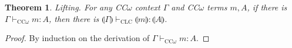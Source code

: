 \documentclass{article}
\newtheorem{theorem}{Theorem}[section]
\theoremstyle{definition}
\newcommand{\lift}[1]{\llparenthesis #1 \rrparenthesis}
\begin{document}
\begin{theorem}\label{lifting}
  Lifting. For any CC$\omega$ context $\Gamma$ and CC$\omega$ terms $m, A$, if there is $\Gamma \vdash_{\scriptscriptstyle \text{CC$\omega$}} m : A$, then there is $\lift{\Gamma} \vdash_{\scriptscriptstyle \text{CLC}} \lift{m} : \lift{A}$.
\end{theorem}
\begin{proof}
  By induction on the derivation of $\Gamma \vdash_{\scriptscriptstyle \text{CC$\omega$}} m : A$.
\end{proof}
\end{document}
